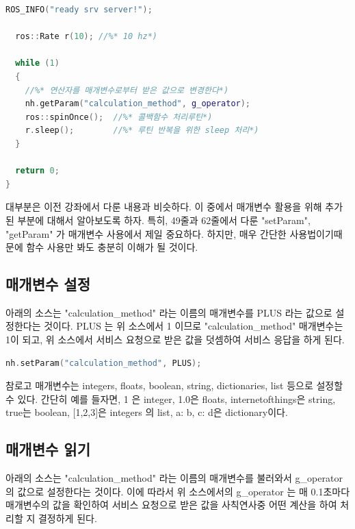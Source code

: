 \begin{lstlisting}[language=C++]
  ROS_INFO("ready srv server!");
   
  ros::Rate r(10); //%* 10 hz*)
 
  while (1)
  {
    //%* 연산자를 매개변수로부터 받은 값으로 변경한다*)
    nh.getParam("calculation_method", g_operator);  
    ros::spinOnce();  //%* 콜백함수 처리루틴*)
    r.sleep();        //%* 루틴 반복을 위한 sleep 처리*)
  }
 
  return 0;
}
\end{lstlisting}

\noindent
대부분은 이전 강좌에서 다룬 내용과 비슷하다. 이 중에서 매개변수 활용을 위해 추가된 부분에 대해서 알아보도록 하자. 특히, 49줄과 62줄에서 다룬 "setParam", "getParam" 가 매개변수 사용에서 제일 중요하다. 하지만, 매우 간단한 사용법이기때문에 함수 사용만 봐도 충분히 이해가 될 것이다.

\subsection{매개변수 설정}

아래의 소스는 "calculation\_method" 라는 이름의 매개변수를 PLUS 라는 값으로 설정한다는 것이다. PLUS 는 위 소스에서 1 이므로 "calculation\_method" 매개변수는 1이 되고, 위 소스에서 서비스 요청으로 받은 값을 덧셈하여 서비스 응답을 하게 된다.

\begin{lstlisting}[language=C++]
nh.setParam("calculation_method", PLUS);
\end{lstlisting}

\noindent
참로고 매개변수는 integers, floats, boolean, string, dictionaries, list 등으로 설정할 수 있다. 간단히 예를 들자면, 1 은 integer, 1.0은 floats, internetofthings은 string, true는 boolean, [1,2,3]은 integers 의 list, {a: b, c: d}은 dictionary이다. 

\subsection{매개변수 읽기}

아래의 소스는 "calculation\_method" 라는 이름의 매개변수를 불러와서 g\_operator 의 값으로 설정한다는 것이다. 이에 따라서 위 소스에서의 g\_operator 는 매 0.1초마다 매개변수의 값을 확인하여 서비스 요청으로 받은 값을 사칙연사중 어떤 계산을 하여 처리할 지 결정하게 된다.


